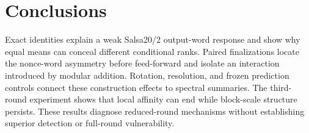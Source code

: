 \documentclass[electronics,article,submit,pdftex,oneauthor]{Definitions/mdpi}
\begin{document}
\section{Conclusions}

Exact identities explain a weak Salsa20/2 output-word response and show why equal means can conceal different conditional ranks. Paired finalizations locate the nonce-word asymmetry before feed-forward and isolate an interaction introduced by modular addition. Rotation, resolution, and frozen prediction controls connect these construction effects to spectral summaries. The third-round experiment shows that local affinity can end while block-scale structure persists. These results diagnose reduced-round mechanisms without establishing superior detection or full-round vulnerability.

\end{document}
